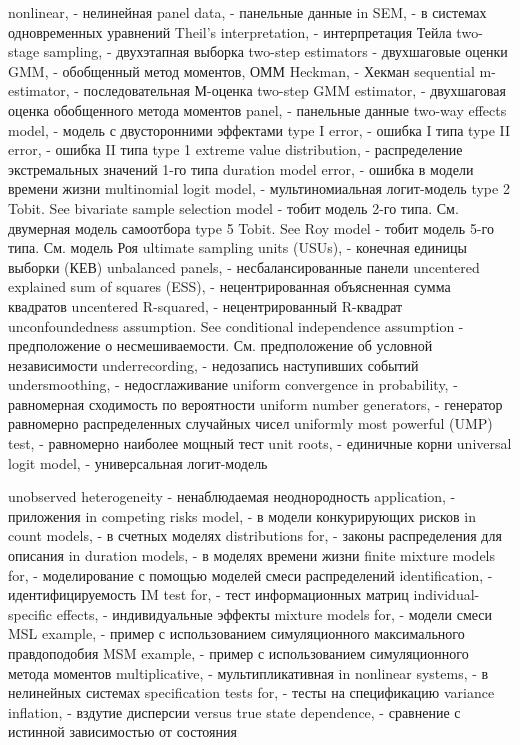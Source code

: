 nonlinear, - нелинейная
panel data, - панельные данные
in SEM, - в системах одновременных уравнений
Theil’s interpretation, - интерпретация Тейла 
two-stage sampling, - двухэтапная выборка
two-step estimators - двухшаговые оценки
GMM, - обобщенный метод моментов, ОММ
Heckman, - Хекман 
sequential m-estimator, - последовательная М-оценка
two-step GMM estimator, - двухшаговая оценка обобщенного метода моментов 
panel, - панельные данные
two-way effects model, - модель с двусторонними эффектами
type I error, - ошибка I типа
type II error, - ошибка II типа
type 1 extreme value distribution, - распределение экстремальных значений 1-го типа
duration model error, - ошибка в модели времени жизни
multinomial logit model, - мультиномиальная логит-модель
type 2 Tobit. See bivariate sample selection model - тобит модель 2-го типа. См. двумерная модель самоотбора
type 5 Tobit. See Roy model - тобит модель 5-го типа. См. модель Роя
ultimate sampling units (USUs), - конечная единицы выборки (КЕВ)
unbalanced panels, - несбалансированные панели
uncentered explained sum of squares (ESS), - нецентрированная объясненная сумма квадратов 
uncentered R-squared, - нецентрированный R-квадрат
unconfoundedness assumption. See conditional independence assumption - предположение о несмешиваемости. См. предположение об условной независимости
underrecording, - недозапись наступивших событий
undersmoothing, - недосглаживание
uniform convergence in probability, - равномерная сходимость по вероятности
uniform number generators, - генератор равномерно распределенных случайных чисел
uniformly most powerful (UMP) test, - равномерно наиболее мощный тест
unit roots, - единичные корни
universal logit model, - универсальная логит-модель

unobserved heterogeneity - ненаблюдаемая неоднородность
application, - приложения
in competing risks model, - в модели конкурирующих рисков
in count models, - в счетных моделях
distributions for, - законы распределения для описания
in duration models, - в моделях времени жизни
finite mixture models for, - моделирование с помощью моделей смеси распределений
identification, - идентифицируемость
IM test for, - тест информационных матриц
individual-specific effects, - индивидуальные эффекты
mixture models for, - модели смеси
MSL example, - пример с использованием симуляционного максимального правдоподобия
MSM example, - пример с использованием симуляционного метода моментов
multiplicative, - мультипликативная
in nonlinear systems, - в нелинейных системах
specification tests for, - тесты на спецификацию
variance inflation, - вздутие дисперсии
versus true state dependence, - сравнение с истинной зависимостью от состояния


